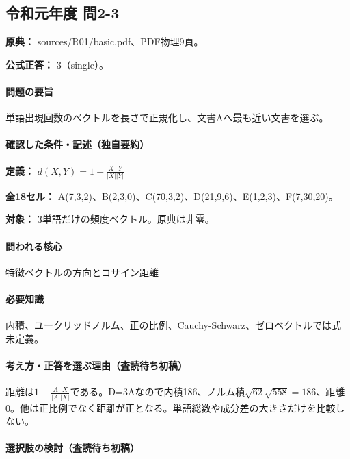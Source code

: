 \subsection{令和元年度 問2-3}
\label{q:r01-reg-basic-2-3}

\noindent\textbf{原典：} sources/R01/basic.pdf、PDF物理9頁。

\textbf{公式正答：} 3（single）。

\paragraph{問題の要旨} 単語出現回数のベクトルを長さで正規化し、文書Aへ最も近い文書を選ぶ。

\paragraph{確認した条件・記述（独自要約）}\mbox{}\par

\noindent\textbf{定義：} \(d(X,Y)=1-\frac{X\cdot Y}{|X||Y|}\)\par

\noindent\textbf{全18セル：} A(7,3,2)、B(2,3,0)、C(70,3,2)、D(21,9,6)、E(1,2,3)、F(7,30,20)。\par

\noindent\textbf{対象：} 3単語だけの頻度ベクトル。原典は非零。\par

\paragraph{問われる核心} 特徴ベクトルの方向とコサイン距離

\paragraph{必要知識} 内積、ユークリッドノルム、正の比例、Cauchy-Schwarz、ゼロベクトルでは式未定義。

\paragraph{考え方・正答を選ぶ理由（査読待ち初稿）} 距離は\(1-\frac{A\cdot X}{|A||X|}\)である。D=\allowbreak{}3Aなので内積186、ノルム積\(\sqrt{62}\sqrt{558}=186\)、距離0。他は正比例でなく距離が正となる。単語総数や成分差の大きさだけを比較しない。

\paragraph{選択肢の検討（査読待ち初稿）}\mbox{}\par

